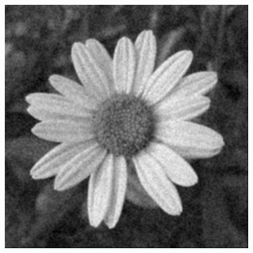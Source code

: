 \documentclass[a4paper]{report}
\begin{document}
\begin{figure}[H]
\begin{minipage}{.3\textwidth}
\end{minipage}%
\begin{minipage}{.3\textwidth}
  \centering
  \includegraphics[width=0.95\textwidth]{images/Smooth/spatial-gaussian/flower_smooth_spatial_gaussian_20_2.png}
\end{minipage}
\end{figure}
\end{document}
